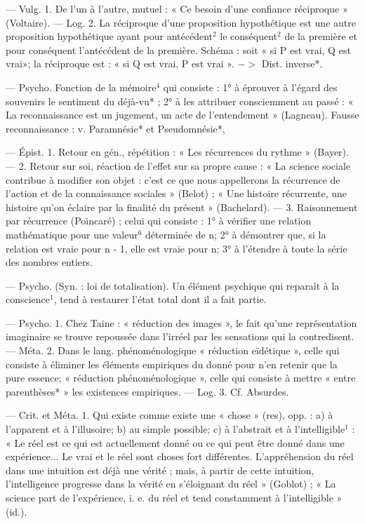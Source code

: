\begin{itemize}[leftmargin=1cm, label=, itemsep=1pt]
 — Vulg. 1. De l’un à
l’autre, mutuel : « Ce besoin d’une
confiance réciproque » (Voltaire). —
Log. 2. La réciproque d’une proposition hypothétique est une autre
proposition hypothétique ayant pour
antécédent$^2$ le conséquent$^2$ de la
première et pour conséquent l’antécédent
de la première. Schéma : soit
« si P est vrai, Q est vrai»; la réciproque est : « si Q est vrai, P est
vrai ». $->$ Dist. inverse*.

 — Psycho. Fonction
de la mémoire$^4$ qui consiste : 1° à
éprouver à l’égard des souvenirs le
sentiment du déjà-vu* ; 2° à les
attribuer consciemment au passé :
« La reconnaissance est un jugement, un acte de l’entendement »
(Lagneau). Fausse reconnaissance :
v. Paramnésie* et Pseudomnésie*,

 — Épist. 1. Retour en
gén., répétition : « Les récurrences
du rythme » (Bayer). — 2. Retour
sur soi, réaction de l'effet sur sa
propre cause : « La science sociale
contribue à modifier son objet : c’est
ce que nous appellerons la récurrence de l’action et de la connaissance sociales » (Belot) ; « Une histoire récurrente, une histoire qu'on
éclaire par la finalité du présent »
(Bachelard). — 3. Raisonnement par
récurrence (Poincaré) ; celui qui consiste : 1° à vérifier une relation mathématique pour une valeur$^6$ déterminée de n; 2° à démontrer que, si
la relation est vraie pour n - 1,
elle est vraie pour n; 3° à l’étendre
à toute la série des nombres entiers.

 — Psycho.
(Syn. : loi de totalisation). Un élément psychique qui reparaît à la
conscience$^1$, tend à restaurer l’état
total dont il a fait partie.

 — Psycho. 1. Chez Taine :
« réduction des images », le fait
qu’une représentation imaginaire se
trouve repoussée dans l'irréel par
les sensations qui la contredisent. —
Méta. 2. Dans le lang. phénoménologique « réduction eïdétique »,
celle qui consiste à éliminer les éléments
empiriques du donné pour
n’en retenir que la pure essence;
« réduction phénoménologique »,
celle qui consiste à mettre « entre
parenthèses* » les existences empiriques. — Log. 3. Cf. Absurdes.

 — Crit. et Méta. 1. Qui existe
comme existe une « chose » (res),
opp. : a) à l’apparent et à l’illusoire;
b) au simple possible; c) à l’abstrait
et à l’intelligible$^1$ : « Le réel est ce
qui est actuellement donné ou ce
qui peut être donné dans une expérience... Le vrai et le réel sont choses
fort différentes. L’appréhension du
réel dans une intuition est déjà une
vérité ; mais, à partir de cette intuition, l'intelligence progresse dans la
vérité en s’éloignant du réel »
(Goblot) ; « La science part de l’expérience, i. e. du réel et tend constamment à l'intelligible » (id.).


\end{itemize}
